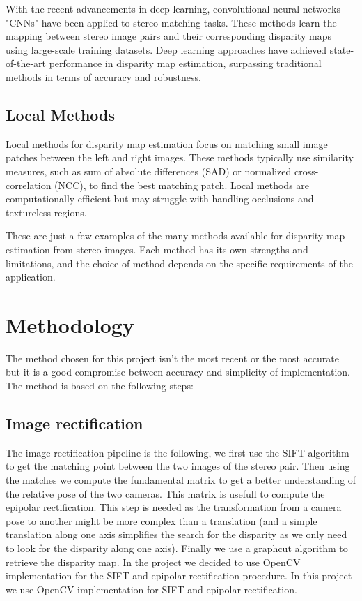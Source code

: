 \documentclass[10pt,twocolumn,letterpaper]{article}
\begin{document}
With the recent advancements in deep learning, convolutional neural networks "CNNs" \cite{schmidhuberDeepLearningNeural2015} have been applied to stereo matching tasks. These methods learn the mapping between stereo image pairs and their corresponding disparity maps using large-scale training datasets. Deep learning approaches have achieved state-of-the-art performance in disparity map estimation, surpassing traditional methods in terms of accuracy and robustness.

\subsection{Local  Methods}

Local methods for disparity map estimation focus on matching small image patches between the left and right images. These methods typically use similarity measures, such as sum of absolute differences (SAD) or normalized cross-correlation (NCC), to find the best matching patch. Local methods are computationally efficient but may struggle with handling occlusions and textureless regions.

These are just a few examples of the many methods available for disparity map estimation from stereo images. Each method has its own strengths and limitations, and the choice of method depends on the specific requirements of the application.


\section{Methodology}
The method chosen for this project isn't the most recent or the most accurate but it is a good compromise between accuracy and simplicity of implementation. The method is based on the following steps:
\subsection{Image rectification}

The image rectification pipeline is the following, we first use the SIFT algorithm to get the matching point between the two images of the stereo pair. Then using the matches we compute the fundamental matrix to get a better understanding of the relative pose of the two cameras. This matrix is usefull to compute the epipolar rectification. This step is needed as the transformation from a camera pose to another might be more complex than a translation (and a simple translation along one axis simplifies the search for the disparity as we only need to look for the disparity along one axis). Finally we use a graphcut \cite{kolomogorov} algorithm to retrieve the disparity map. In the project we decided to use OpenCV implementation for the SIFT\cite{lindebergScaleInvariantFeature2012} and epipolar rectification procedure. In this project we use OpenCV implementation for SIFT and epipolar rectification.
\end{document}
